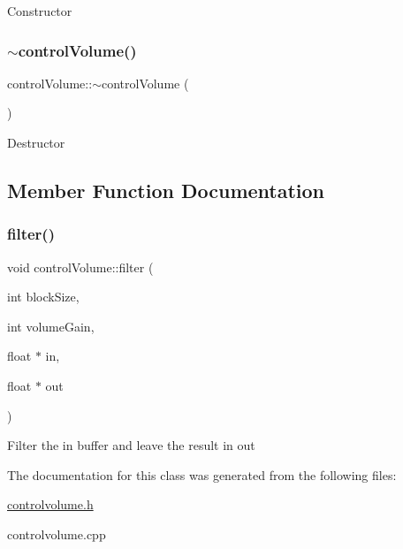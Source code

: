 Constructor \mbox{\label{classcontrolVolume_ab5a9d8e84cc9ece689ad435dba3cb1bc}} 
\subsubsection{\texorpdfstring{$\sim$control\+Volume()}{~controlVolume()}}
{\footnotesize\ttfamily control\+Volume\+::$\sim$control\+Volume (\begin{DoxyParamCaption}{ }\end{DoxyParamCaption})}

Destructor 

\subsection{Member Function Documentation}
\mbox{\label{classcontrolVolume_a8ef56b8cabc733043d207b186e156b12}} 
\subsubsection{\texorpdfstring{filter()}{filter()}}
{\footnotesize\ttfamily void control\+Volume\+::filter (\begin{DoxyParamCaption}\item[{int}]{block\+Size,  }\item[{int}]{volume\+Gain,  }\item[{float $\ast$}]{in,  }\item[{float $\ast$}]{out }\end{DoxyParamCaption})}

Filter the in buffer and leave the result in out 

The documentation for this class was generated from the following files\+:\begin{DoxyCompactItemize}
\item 
\hyperlink{controlvolume_8h}{controlvolume.\+h}\item 
controlvolume.\+cpp\end{DoxyCompactItemize}

